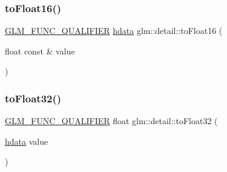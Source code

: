 \subsubsection{\texorpdfstring{to\+Float16()}{toFloat16()}}
{\footnotesize\ttfamily \hyperlink{setup_8hpp_a33fdea6f91c5f834105f7415e2a64407}{G\+L\+M\+\_\+\+F\+U\+N\+C\+\_\+\+Q\+U\+A\+L\+I\+F\+I\+ER} \hyperlink{namespaceglm_1_1detail_aa2115f7dd38e14fea7ba9e95104120f3}{hdata} glm\+::detail\+::to\+Float16 (\begin{DoxyParamCaption}\item[{float const \&}]{value }\end{DoxyParamCaption})}

\mbox{\label{namespaceglm_1_1detail_a8e4719d94d99ee1e625496e04317272b}} 
\subsubsection{\texorpdfstring{to\+Float32()}{toFloat32()}}
{\footnotesize\ttfamily \hyperlink{setup_8hpp_a33fdea6f91c5f834105f7415e2a64407}{G\+L\+M\+\_\+\+F\+U\+N\+C\+\_\+\+Q\+U\+A\+L\+I\+F\+I\+ER} float glm\+::detail\+::to\+Float32 (\begin{DoxyParamCaption}\item[{\hyperlink{namespaceglm_1_1detail_aa2115f7dd38e14fea7ba9e95104120f3}{hdata}}]{value }\end{DoxyParamCaption})}

